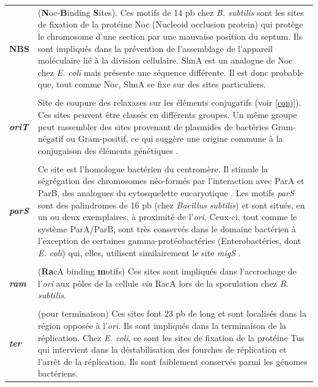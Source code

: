 \begin{longtable}{@{\hspace{-2cm}\hspace{1cm}} >{\bfseries}p{}  | >{\small}p{}}
	\\[-0.2cm]
	 NBS & (\textbf{N}oc-\textbf{B}inding \textbf{S}ites). Ces motifs de 14 pb chez \textit{B. subtilis} sont les sites de fixation de la protéine Noc (Nucleoid occlusion protein) qui protège le chromosome d'une section par une mauvaise position du septum. Ils sont impliqués dans la prévention de l'assemblage de l'appareil moléculaire lié à la division cellulaire. SlmA est un analogue de Noc chez \textit{E. coli} mais présente une séquence différente. Il est donc probable que, tout comme Noc, SlmA se fixe sur des sites particuliers.\\
	\\[-0.2cm]
	\textit{oriT} & Site de coupure des relaxases sur les éléments conjugatifs (voir \ref{conj}). Ces sites peuvent être classés en différents groupes. Un même groupe peut rassembler des sites provenant de plasmides de bactéries Gram-négatif ou Gram-positif, ce qui suggère une origine commune à la conjugaison des éléments génétiques \citep{lawley2004bacterial}.\\
	\\[-0.2cm]
	\textit{parS} & Ce site est l'homologue bactérien du centromère. Il stimule la ségrégation des chromosomes néo-formés par l'interaction avec ParA et ParB, des analogues du cytosquelette eucaryotique \citep{Livny2007}. Les motifs \textit{parS} sont des palindromes de 16 pb (chez \textit{Bacillus subtilis}) et sont situés, en un ou deux exemplaires, à proximité de l'\textit{ori}. Ceux-ci, tout comme le système ParA/ParB, sont très conservés dans le domaine bactérien à l'exception de certaines gamma-protéobactéries (Enterobactéries, dont \textit{E. coli}) qui, elles, utilisent similairement le site \textit{migS} \citep{Livny2007,Mierzejewska2012}.\\
	\\[-0.2cm]
	 \textit{ram} & (\textbf{Ra}cA binding \textbf{m}otifs) Ces sites sont impliqués dans l'accrochage de l'\textit{ori} aux pôles de la cellule \textit{via} RacA lors de la sporulation chez \textit{B. subtilis}.\\
	\\[-0.2cm]
	 \textit{ter} & (pour terminaison) Ces sites font 23 pb de long et sont localisés dans la région opposée à l'\textit{ori}. Ils sont impliqués dans la terminaison de la réplication. Chez \textit{E. coli}, ce sont les sites de fixation de la protéine Tus qui intervient dans la déstabilisation des fourches de réplication et l'arrêt de la réplication. Ils sont faiblement conservés parmi les génomes bactériens.\\
	\end{longtable}


